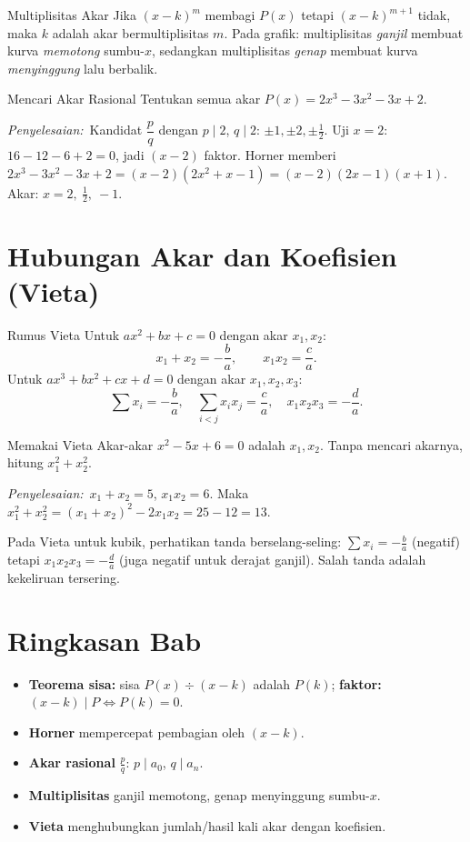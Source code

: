 \documentclass[11pt,a4paper]{report}
\theoremstyle{gaya}
\newcommand{\jawab}{\par\smallskip\noindent\textit{\textcolor{oranye}{Penyelesaian:}}\ }
\begin{document}
\begin{konsep}{Multiplisitas Akar}
Jika $(x-k)^m$ membagi $P(x)$ tetapi $(x-k)^{m+1}$ tidak, maka $k$ adalah akar bermultiplisitas $m$. Pada grafik: multiplisitas \emph{ganjil} membuat kurva \emph{memotong} sumbu-$x$, sedangkan multiplisitas \emph{genap} membuat kurva \emph{menyinggung} lalu berbalik.
\end{konsep}

\begin{contoh}{Mencari Akar Rasional}
Tentukan semua akar $P(x)=2x^3-3x^2-3x+2$.

\jawab Kandidat $\dfrac pq$ dengan $p\mid2$, $q\mid2$: $\pm1,\pm2,\pm\tfrac12$. Uji $x=2$: $16-12-6+2=0$, jadi $(x-2)$ faktor. Horner memberi $2x^3-3x^2-3x+2=(x-2)(2x^2+x-1)=(x-2)(2x-1)(x+1)$. Akar: $x=2,\ \tfrac12,\ -1$.
\end{contoh}

\section{Hubungan Akar dan Koefisien (Vieta)}
\begin{konsep}{Rumus Vieta}
Untuk $ax^2+bx+c=0$ dengan akar $x_1,x_2$:
\[
x_1+x_2=-\frac{b}{a},\qquad x_1x_2=\frac{c}{a}.
\]
Untuk $ax^3+bx^2+cx+d=0$ dengan akar $x_1,x_2,x_3$:
\[
\sum x_i=-\frac{b}{a},\quad \sum_{i<j}x_ix_j=\frac{c}{a},\quad x_1x_2x_3=-\frac{d}{a}.
\]
\end{konsep}

\begin{contoh}{Memakai Vieta}
Akar-akar $x^2-5x+6=0$ adalah $x_1,x_2$. Tanpa mencari akarnya, hitung $x_1^2+x_2^2$.

\jawab $x_1+x_2=5$, $x_1x_2=6$. Maka $x_1^2+x_2^2=(x_1+x_2)^2-2x_1x_2=25-12=13.$
\end{contoh}

\begin{kesalahan}
Pada Vieta untuk kubik, perhatikan tanda berselang-seling: $\sum x_i=-\tfrac ba$ (negatif) tetapi $x_1x_2x_3=-\tfrac da$ (juga negatif untuk derajat ganjil). Salah tanda adalah kekeliruan tersering.
\end{kesalahan}

\section*{Ringkasan Bab}
\begin{itemize}[leftmargin=*,topsep=2pt]
  \item \textbf{Teorema sisa:} sisa $P(x)\div(x-k)$ adalah $P(k)$; \textbf{faktor:} $(x-k)\mid P \Leftrightarrow P(k)=0$.
  \item \textbf{Horner} mempercepat pembagian oleh $(x-k)$.
  \item \textbf{Akar rasional} $\tfrac pq$: $p\mid a_0$, $q\mid a_n$.
  \item \textbf{Multiplisitas} ganjil memotong, genap menyinggung sumbu-$x$.
  \item \textbf{Vieta} menghubungkan jumlah/hasil kali akar dengan koefisien.
\end{itemize}
\end{document}
